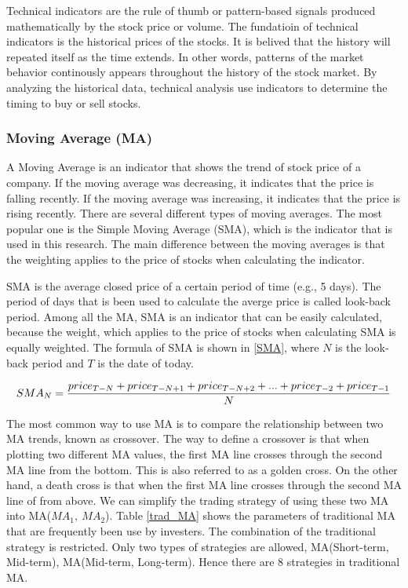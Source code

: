 \documentclass[../Proposed Method.tex]{subfiles}
\begin{document}
Technical indicators are the rule of thumb or pattern-based signals produced mathematically by the stock price or volume. The fundatioin of technical indicators is the historical prices of the stocks. It is belived that the history will repeated itself as the time extends. In other words, patterns of the market behavior continously appears throughout the history of the stock market. By analyzing the historical data, technical analysis use indicators to determine the timing to buy or sell stocks.

\subsubsection{Moving Average (MA)}

A Moving Average is an indicator that shows the trend of stock price of a company. If the moving average was decreasing, it indicates that the price is falling recently. If the moving average was increasing, it indicates that the price is rising recently. There are several different types of moving averages. The most popular one is the Simple Moving Average (SMA), which is the indicator that is used in this research. The main difference between the moving averages is that the weighting applies to the price of stocks when calculating the indicator.

\bigbreak

SMA is the average closed price of a certain period of time (e.g., 5 days). The period of days that is been used to calculate the averge price is called look-back period. Among all the MA, SMA is an indicator that can be easily calculated, because the weight, which applies to the price of stocks when calculating SMA is equally weighted. The formula of SMA is shown in \ref{SMA}, where $N$ is the look-back period and $T$ is the date of today.

\begin{equation}
    \label{SMA}
    \scalebox{1}
    {$SMA_{N} = \dfrac{price_{T-N}+price_{T-N+1}+price_{T-N+2}+...+price_{T-2}+price_{T-1}}{N}$}
\end{equation}

The most common way to use MA is to compare the relationship between two MA trends, known as crossover. The way to define a crossover is that when plotting two different MA values, the first MA line crosses through the second MA line from the bottom. This is also referred to as a golden cross. On the other hand, a death cross is that when the first MA line crosses through the second MA line of from above. We can simplify the trading strategy of using these two MA into MA($MA_{1},\ MA_{2}$). Table \ref{trad_MA} shows the parameters of traditional MA that are frequently been use by investers. The combination of the traditional strategy is restricted. Only two types of strategies are allowed, MA(Short-term, Mid-term), MA(Mid-term, Long-term). Hence there are 8 strategies in traditional MA.
\end{document}
